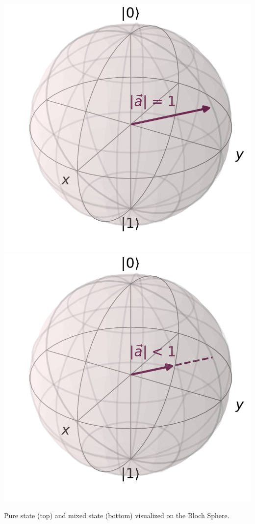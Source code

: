 \begin{marginfigure}[-3 cm]
    \centering
    \includegraphics[]{Figs/Theory/bloch_sphere_pure.pdf}
    \includegraphics[]{Figs/Theory/bloch_sphere_mixed.pdf}
    \caption{Pure state (top) and mixed state (bottom) visualized on the Bloch Sphere.}
    \label{fig:bloch_sphere_density_matrix}
\end{marginfigure}

